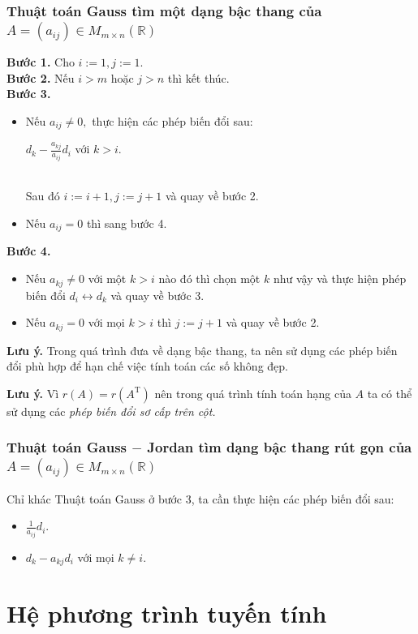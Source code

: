 \subsubsection{Thuật toán Gauss tìm một dạng bậc thang của $A = \left( a_{ij} \right) \in M_{m \times n} \left( {\mathbb{R}} \right)$}
\textbf{Bước 1.} Cho $i := 1, j := 1.$\\
\textbf{Bước 2.} Nếu $i > m$ hoặc $j > n$ thì kết thúc.\\
\textbf{Bước 3.}
\begin{itemize}
\item Nếu $a_{ij} \ne 0,$ thực hiện các phép biến đổi sau:\\
\centerline{${d_k} - \frac{{{a_{kj}}}}{{{a_{ij}}}}{d_i}$ với $k > i.$} \\
Sau đó $i := i + 1, j := j + 1$ và quay về bước 2.
\item Nếu $a_{ij} = 0$ thì sang bước 4.
\end{itemize}
\textbf{Bước 4.} 
\begin{itemize}
\item Nếu $a_{kj} \ne 0$ với một $k > i$ nào đó thì chọn một $k$ như vậy và thực hiện phép biến đổi $d_i \leftrightarrow d_k$ và quay về bước 3.
\item Nếu $a_{kj} = 0$ với mọi $k > i$ thì $j := j + 1$ và quay về bước 2.
\end{itemize}
\begin{mybox}
\textbf{Lưu ý.} Trong quá trình đưa về dạng bậc thang, ta nên sử dụng các phép biến đổi phù hợp để hạn chế việc tính toán các số không đẹp.
\end{mybox}
\begin{mybox}
\textbf{Lưu ý.} Vì $r \left( A \right) = r \left( {A^{\mathrm{T}}} \right)$ nên trong quá trình tính toán hạng của $A$ ta có thể sử dụng các \textit{phép biến đổi sơ cấp trên cột.}
\end{mybox}
\subsubsection{Thuật toán Gauss $-$ Jordan tìm dạng bậc thang rút gọn của $A = \left( a_{ij} \right) \in M_{m \times n} \left( {\mathbb{R}} \right)$}
Chỉ khác Thuật toán Gauss ở bước 3, ta cần thực hiện các phép biến đổi sau:
\begin{itemize}
\item $\frac{1}{a_{ij}} d_i.$
\item $d_k - a_{kj}d_i$ với mọi $k \ne i.$
\end{itemize}
\section{Hệ phương trình tuyến tính}
